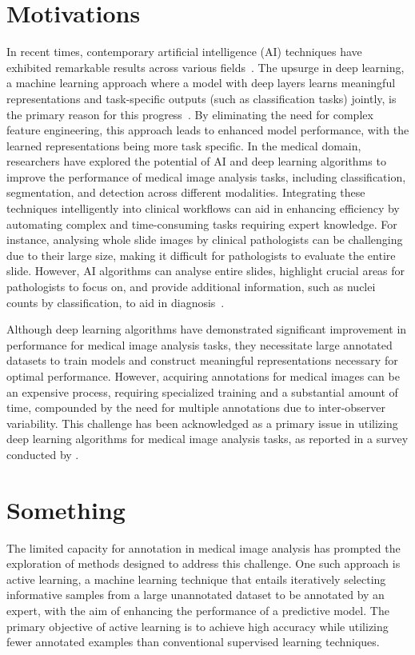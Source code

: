 \section{Motivations}
\label{sec:motivation}
In recent times, contemporary artificial intelligence (AI) techniques have exhibited remarkable results across various fields~\citep{sarker2021deep}. The upsurge in deep learning, a machine learning approach where a model with deep layers learns meaningful representations and task-specific outputs (such as classification tasks) jointly, is the primary reason for this progress~\citep{lecun2015deep}. By eliminating the need for complex feature engineering, this approach leads to enhanced model performance, with the learned representations being more task specific. In the medical domain, researchers have explored the potential of AI and deep learning algorithms to improve the performance of medical image analysis tasks, including classification, segmentation, and detection across different modalities. Integrating these techniques intelligently into clinical workflows can aid in enhancing efficiency by automating complex and time-consuming tasks requiring expert knowledge. For instance, analysing whole slide images by clinical pathologists can be challenging due to their large size, making it difficult for pathologists to evaluate the entire slide. However, AI algorithms can analyse entire slides, highlight crucial areas for pathologists to focus on, and provide additional information, such as nuclei counts by classification, to aid in diagnosis~\citep{dimitriou2019deep}.

Although deep learning algorithms have demonstrated significant improvement in performance for medical image analysis tasks, they necessitate large annotated datasets to train models and construct meaningful representations necessary for optimal performance. However, acquiring annotations for medical images can be an expensive process, requiring specialized training and a substantial amount of time, compounded by the need for multiple annotations due to inter-observer variability. This challenge has been acknowledged as a primary issue in utilizing deep learning algorithms for medical image analysis tasks, as reported in a survey conducted by \cite{litjens2017survey}.

\section{Something}
\label{sec:something}
The limited capacity for annotation in medical image analysis has prompted the exploration of methods designed to address this challenge. One such approach is active learning, a machine learning technique that entails iteratively selecting informative samples from a large unannotated dataset to be annotated by an expert, with the aim of enhancing the performance of a predictive model. The primary objective of active learning is to achieve high accuracy while utilizing fewer annotated examples than conventional supervised learning techniques.

